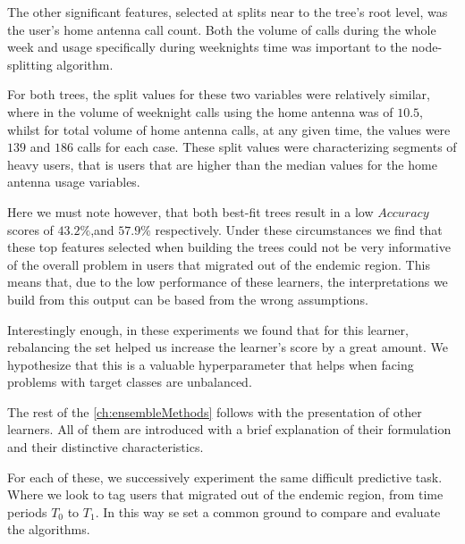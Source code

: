 The other significant features, selected at splits near to the tree's root level, was the user's home antenna call count.
Both the volume of calls during the whole week and usage specifically during weeknights time was important to the node-splitting algorithm.

For both trees, the split values for these two variables were relatively similar, where in the volume of weeknight calls using the home antenna was of $10.5$, whilst for total volume of home antenna calls, at any given time, the values were $139$ and $186$ calls for each case.
These split values were characterizing segments of heavy users, that is users that are higher than the median values for the home antenna usage variables.%



Here we must note however, that both best-fit trees result in a low $Accuracy$ scores of $43.2\%$,and $57.9\%$ respectively.
Under these circumstances we find that these top features selected when building the trees could not be very informative of the overall problem in users that migrated out of the endemic region.
This means that, due to the low performance of these learners, the interpretations we build from this output can be based from the wrong assumptions.



Interestingly enough, in these experiments we found that for this learner, rebalancing the set helped us increase the learner's score by a great amount.
We hypothesize that this is a valuable hyperparameter that helps when facing problems with target classes are unbalanced.



The rest of the \cref{ch:ensembleMethods} follows with the presentation of other learners.
All of them are introduced with a brief explanation of their formulation and their distinctive characteristics.

For each of these, we successively experiment the same difficult predictive task.
Where we look to tag users that migrated out of the endemic region, from time periods $T_0$ to $T_1$.
In this way se set a common ground to compare and evaluate the algorithms.

